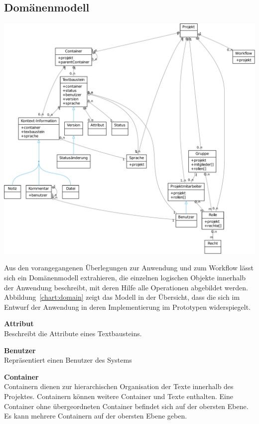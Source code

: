 \subsection{Domänenmodell}\label{l:domänenmodell}

\begin{center}
\includegraphics[width=\textwidth]{media/domain.pdf}
\label{chart:domain}
\end{center}

Aus den vorangegangenen Überlegungen zur Anwendung und zum Workflow lässt sich ein Domänenmodell extrahieren, die einzelnen logischen Objekte innerhalb der Anwendung beschreibt, mit deren Hilfe alle Operationen abgebildet werden. Abbildung~\ref{chart:domain} zeigt das Modell in der Übersicht, dass die sich im Entwurf der Anwendung in deren Implementierung im Prototypen widerspiegelt.

\textsf{\textbf{Attribut}}\\Beschreibt die Attribute eines Textbausteins.

\textsf{\textbf{Benutzer}}\\Repräsentiert einen Benutzer des Systems

\textsf{\textbf{Container}}\\Containern dienen zur hierarchischen Organisation der Texte innerhalb des Projektes. Containern können weitere Container und Texte enthalten. Eine Container ohne übergeordneten Container befindet sich auf der obersten Ebene. Es kann mehrere Containern auf der obersten Ebene geben.

